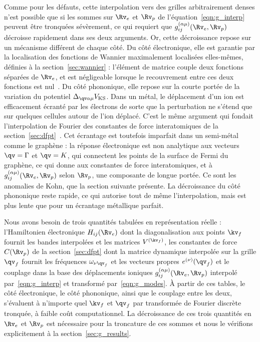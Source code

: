 Comme pour les défauts, cette interpolation vers des grilles arbitrairement denses n'est possible que si les sommes sur $\Rv_e$ et $\Rv_p$ de l'équation~\eqref{eqn:g_interp} peuvent être tronquées sévèrement, ce qui requiert que $g_{ij}^{(\alpha\mu)}(\Rv_e,\Rv_p)$ décroisse rapidement dans ses deux arguments. Or, cette décroissance repose sur un mécanisme différent de chaque côté. Du côté électronique, elle est garantie par la localisation des fonctions de Wannier maximalement localisées elles-mêmes, définies à la section~\ref{sec:wannier} : l'élément de matrice couple deux fonctions séparées de $\Rv_e$, et est négligeable lorsque le recouvrement entre ces deux fonctions est nul~\cite{brouderExponentialLocalizationWannier2007,marzariMaximallyLocalizedWannier2012a}. Du côté phononique, elle repose sur la courte portée de la variation du potentiel $\Delta_{\qv\alpha\mu}V_\text{KS}$. Dans un métal, le déplacement d'un ion est efficacement écranté par les électrons de sorte que la perturbation ne s'étend que sur quelques cellules autour de l'ion déplacé. C'est le même argument qui fondait l'interpolation de Fourier des constantes de force interatomiques de la section~\ref{sec:dfpt}~\cite{baroniPhononsRelatedCrystal2001a}. Cet écrantage est toutefois imparfait dans un semi-métal comme le graphène : la réponse électronique est non analytique aux vecteurs $\qv=\Gamma$ et $\qv=K$, qui connectent les points de la surface de Fermi du graphène, ce qui donne aux constantes de force interatomiques, et à $g^{(\alpha\mu)}_{ij}(\Rv_e,\Rv_p)$ selon $\Rv_p$, une composante de longue portée. Ce sont les anomalies de Kohn, que la section suivante présente. La décroissance du côté phononique reste rapide, ce qui autorise tout de même l'interpolation, mais est plus lente que pour un écrantage métallique parfait.

Nous avons besoin de trois quantités tabulées en représentation réelle : l'Hamiltonien électronique $H_{ij}(\Rv_e)$ dont la diagonalisation aux points $\kv_f$ fournit les bandes interpolées et les matrices $V^{(\kv_f)}$, les constantes de force $C(\Rv_p)$ de la section~\ref{sec:dfpt} dont la matrice dynamique interpolée sur la grille $\qv_f$ fournit les fréquences $\omega_{\nu\qv_f}$ et les vecteurs propres $e^{(\nu)}(\qv_f)$ et le couplage dans la base des déplacements ioniques $g_{ij}^{(\alpha\mu)}(\Rv_e,\Rv_p)$ interpolé par~\eqref{eqn:g_interp} et transformé par~\eqref{eqn:g_modes}. À partir de ces tables, le côté électronique, le côté phononique, ainsi que le couplage entre les deux, s'évaluent à n'importe quel $\kv_f$ et $\qv_f$ par transformée de Fourier discrète tronquée, à faible coût computationnel. La décroissance de ces trois quantités en $\Rv_e$ et $\Rv_p$ est nécessaire pour la troncature de ces sommes et nous le vérifions explicitement à la section~\ref{sec:g_results}.

